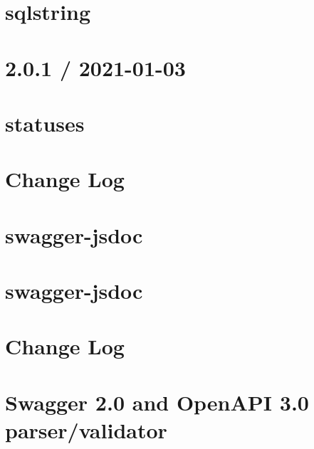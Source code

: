 \documentclass[twoside]{book}
\newcommand{\+}{\discretionary{\mbox{\scriptsize$\hookleftarrow$}}{}{}}
\begin{document}
\chapter{sqlstring}
\label{md_src_nodejs_node_modules_sqlstring_README}

\chapter{2.0.1 / 2021-\/01-\/03}
\label{md_src_nodejs_node_modules_statuses_HISTORY}

\chapter{statuses}
\label{md_src_nodejs_node_modules_statuses_README}

\chapter{Change Log}
\label{md_src_nodejs_node_modules_swagger_jsdoc_CHANGELOG}

\chapter{swagger-\/jsdoc}
\label{md_src_nodejs_node_modules_swagger_jsdoc_docusaurus_README}

\chapter{swagger-\/jsdoc}
\label{md_src_nodejs_node_modules_swagger_jsdoc_README}

\chapter{Change Log}
\label{md_src_nodejs_node_modules_swagger_parser_CHANGELOG}

\chapter{Swagger 2.0 and Open\+API 3.0 parser/validator}
\label{md_src_nodejs_node_modules_swagger_parser_README}

\end{document}
